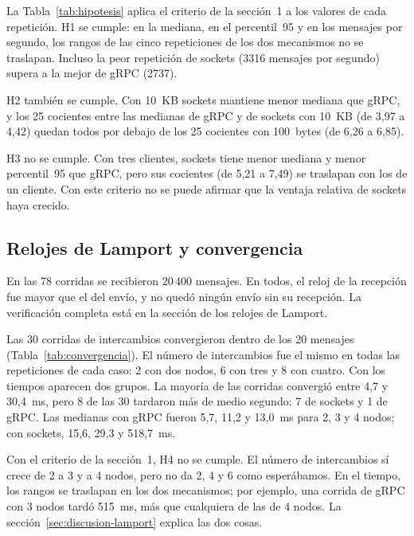 La Tabla~\ref{tab:hipotesis} aplica el criterio de la sección~1 a los valores de cada repetición. H1 se cumple: en la mediana, en el percentil~95 y en los mensajes por segundo, los rangos de las cinco repeticiones de los dos mecanismos no se traslapan. Incluso la peor repetición de sockets (3316 mensajes por segundo) supera a la mejor de gRPC (2737).

H2 también se cumple. Con 10~KB sockets mantiene menor mediana que gRPC, y los 25 cocientes entre las medianas de gRPC y de sockets con 10~KB (de 3,97 a 4,42) quedan todos por debajo de los 25 cocientes con 100~bytes (de 6,26 a 6,85).

H3 no se cumple. Con tres clientes, sockets tiene menor mediana y menor percentil~95 que gRPC, pero sus cocientes (de 5,21 a 7,49) se traslapan con los de un cliente. Con este criterio no se puede afirmar que la ventaja relativa de sockets haya crecido.

\subsection{Relojes de Lamport y convergencia}

En las 78 corridas se recibieron 20\,400 mensajes. En todos, el reloj de la recepción fue mayor que el del envío, y no quedó ningún envío sin su recepción. La verificación completa está en la sección de los relojes de Lamport.

\begin{table}[htbp]
  \centering
  \caption{Convergencia de los relojes de Lamport en las corridas de 20 intercambios}
  \label{tab:convergencia}
  \resizebox{\textwidth}{!}{}
\end{table}

Las 30 corridas de intercambios convergieron dentro de los 20 mensajes (Tabla~\ref{tab:convergencia}). El número de intercambios fue el mismo en todas las repeticiones de cada caso: 2 con dos nodos, 6 con tres y 8 con cuatro. Con los tiempos aparecen dos grupos. La mayoría de las corridas convergió entre 4,7 y 30,4~ms, pero 8 de las 30 tardaron más de medio segundo: 7 de sockets y 1 de gRPC. Las medianas con gRPC fueron 5,7, 11,2 y 13,0~ms para 2, 3 y 4 nodos; con sockets, 15,6, 29,3 y 518,7~ms.

Con el criterio de la sección~1, H4 no se cumple. El número de intercambios sí crece de 2 a 3 y a 4 nodos, pero no da 2, 4 y 6 como esperábamos. En el tiempo, los rangos se traslapan en los dos mecanismos; por ejemplo, una corrida de gRPC con 3 nodos tardó 515~ms, más que cualquiera de las de 4 nodos. La sección~\ref{sec:discusion-lamport} explica las dos cosas.
